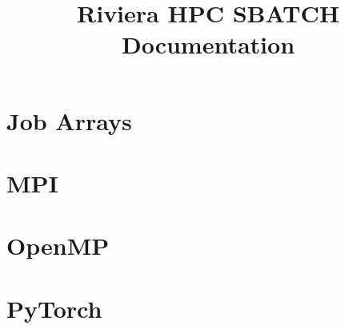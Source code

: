 \documentclass[11pt,letterpaper]{article}
\title{Riviera HPC SBATCH Documentation}
\begin{document}
\startdoc

\section{Job Arrays}


\section{MPI}


\section{OpenMP}


\section{PyTorch}

\end{document}

